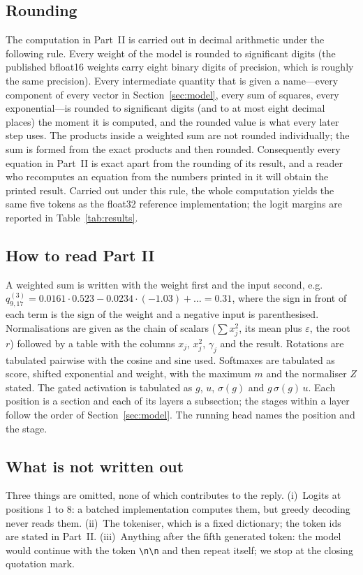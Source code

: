 \documentclass[a4paper,10pt]{article}
\begin{document}
\subsection{Rounding}
\label{sec:rounding}
The computation in Part~II is carried out in decimal arithmetic under the following rule.
Every weight of the model is rounded to \SigW{} significant digits (the published bfloat16 weights carry eight binary digits of precision, which is roughly the same precision).
Every intermediate quantity that is given a name---every component of every vector in Section~\ref{sec:model}, every sum of squares, every exponential---is rounded to \SigA{} significant digits (and to at most eight decimal places) the moment it is computed, and the rounded value is what every later step uses.
The products inside a weighted sum are not rounded individually; the sum is formed from the exact products and then rounded.
Consequently every equation in Part~II is exact apart from the rounding of its result, and a reader who recomputes an equation from the numbers printed in it will obtain the printed result.
Carried out under this rule, the whole computation yields the same five tokens as the float32 reference implementation; the logit margins are reported in Table~\ref{tab:results}.

\subsection{How to read Part II}
A weighted sum is written with the weight first and the input second, e.g.
$q^{(3)}_{9,17} = 0.0161{\cdot}0.523 - 0.0234{\cdot}(-1.03) + \dots = 0.31$,
where the sign in front of each term is the sign of the weight and a negative input is parenthesised.
Normalisations are given as the chain of scalars ($\sum x_j^2$, its mean plus $\varepsilon$, the root $r$) followed by a table with the columns $x_j$, $x_j^2$, $\gamma_j$ and the result.
Rotations are tabulated pairwise with the cosine and sine used.
Softmaxes are tabulated as score, shifted exponential and weight, with the maximum $m$ and the normaliser $Z$ stated.
The gated activation is tabulated as $g$, $u$, $\sigma(g)$ and $g\,\sigma(g)\,u$.
Each position is a section and each of its layers a subsection; the stages within a layer follow the order of Section~\ref{sec:model}.
The running head names the position and the stage.

\subsection{What is not written out}
Three things are omitted, none of which contributes to the reply.
(i)~Logits at positions 1 to 8: a batched implementation computes them, but greedy decoding never reads them.
(ii)~The tokeniser, which is a fixed dictionary; the token ids are stated in Part~II.
(iii)~Anything after the fifth generated token: the model would continue with the token \texttt{\textbackslash n\textbackslash n} and then repeat itself; we stop at the closing quotation mark.
\end{document}
